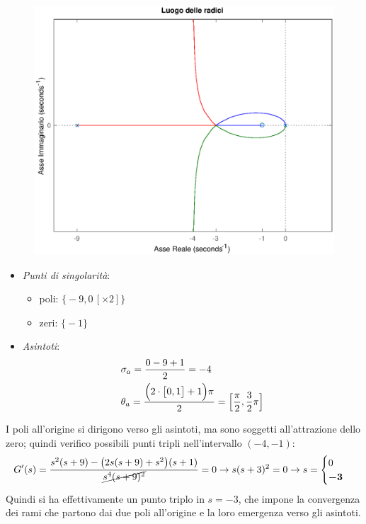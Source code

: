 \begin{figure}[ht]
	\centering
	\includegraphics[scale=.6]{mod1/assets/rl_ex36}
\end{figure}

\begin{itemize}
	\item \emph{Punti di singolarità}:
		\begin{itemize}
			\item poli: \(\bigl\{ -9, 0\,[\times 2] \bigr\}\)
			\item zeri: \(\bigl\{ -1 \bigr\}\)
		\end{itemize}
	\item \emph{Asintoti}:
		\begin{align*}
			& \sigma_a = \frac{0-9+1}{2} = -4 \\
			& \theta_a = \frac{\Bigl(2 \cdot \bigl[ 0,1 \bigr] +1\Bigr) \pi}{2} = \Bigl[ \frac{\pi}{2}, \frac{3}{2}\pi \Bigr]
		\end{align*}
\end{itemize}
I poli all'origine si dirigono verso gli asintoti, ma sono soggetti all'attrazione
dello zero; quindi verifico possibili punti tripli nell'intervallo \((-4,-1)\):
\[
	G^\prime(s) = \frac{s^2(s+9) -\bigl(2s(s+9)+s^2\bigr)(s+1)}{\cancel{s^4 (s+9)^2}} = 0
	\rightarrow s(s+3)^2 = 0 \rightarrow s = \begin{cases} 0 \\ \bm{-3} \end{cases}
\]
Quindi si ha effettivamente un punto triplo in \(s = -3\), che impone la convergenza
dei rami che partono dai due poli all'origine e la loro emergenza verso gli asintoti.


